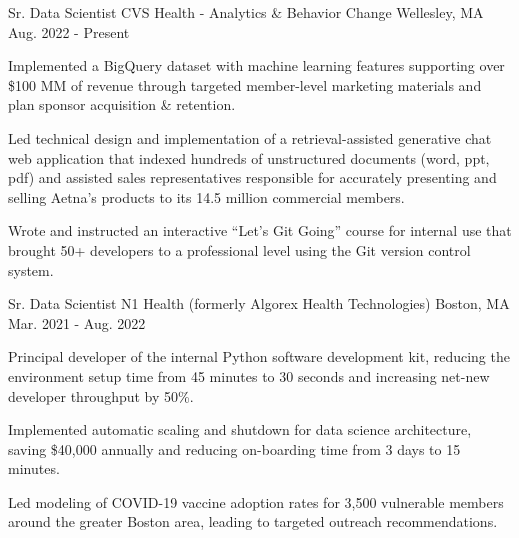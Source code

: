 

\begin{cventries}

  \cventry
    {Sr. Data Scientist} %
    {CVS Health - Analytics \& Behavior Change} %
    {Wellesley, MA} %
    {Aug. 2022 - Present} %
    {
      \begin{cvitems} %
      \item {
        Implemented a BigQuery dataset with machine learning features supporting
        over \$100 MM of revenue through targeted member-level marketing
        materials and plan sponsor acquisition \& retention.
      }
      \item {
        Led technical design and implementation of a retrieval-assisted
        generative chat web application that indexed hundreds of unstructured
        documents (word, ppt, pdf) and assisted sales representatives
        responsible for accurately presenting and selling Aetna's products to
        its 14.5 million commercial members.
      }
      \item {
        Wrote and instructed an interactive ``Let's Git Going'' course for
        internal use that brought 50+ developers to a professional level using
        the Git version control system.
      }
      \end{cvitems}
    }

  \cventry
    {Sr. Data Scientist} %
    {N1 Health (formerly Algorex Health Technologies)} %
    {Boston, MA} %
    {Mar. 2021 - Aug. 2022} %
    {
      \begin{cvitems} %
      \item {
        Principal developer of the internal Python software development kit,
        reducing the environment setup time from 45 minutes to 30 seconds and
        increasing net-new developer throughput by 50\%.
      }
      \item {
        Implemented automatic scaling and shutdown for data science
        architecture, saving \$40,000 annually and reducing on-boarding time
        from 3 days to 15 minutes.
      }
      \item {
        Led modeling of COVID-19 vaccine adoption rates for 3,500 vulnerable
        members around the greater Boston area, leading to targeted outreach
        recommendations.
      }
      \end{cvitems}
    }


\end{cventries}
